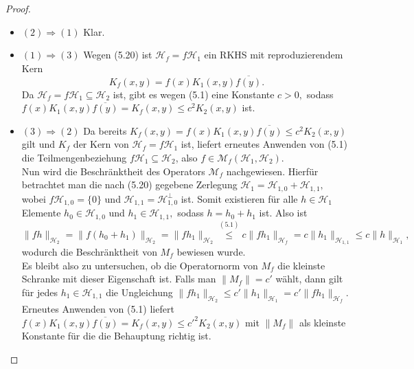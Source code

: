 \documentclass[12pt,titlepage,twoside,cleardoublepage]{article}
\theoremstyle{nummermitklammern}
\numberwithin{equation}{section}
\begin{document}
\begin{proof}
\begin{itemize}
\item $(2)\Rightarrow (1)$ Klar.
\item $(1)\Rightarrow (3)$ Wegen (5.20) ist $\mathcal{H}_f=f\mathcal{H}_1$ ein RKHS mit reproduzierendem Kern
\[
K_f(x,y)=f(x)K_1(x,y)\overline{f(y)}.
\]
 Da $\mathcal{H}_f=f\mathcal{H}_1\subseteq \mathcal{H}_2$ ist, gibt es wegen (5.1) eine Konstante $c>0,$ sodass $f(x)K_1(x,y)\overline{f(y)}=K_f(x,y)\leq c^2K_2(x,y)$ ist.
\item $(3)\Rightarrow (2)$ Da bereits $K_f(x,y)=f(x)K_1(x,y)\overline{f(y)}\leq c^2K_2(x,y)$ gilt und $K_f$ der Kern von $\mathcal{H}_f=f\mathcal{H}_1$ ist, liefert erneutes Anwenden von (5.1) die Teilmengenbeziehung $f\mathcal{H}_1\subseteq\mathcal{H}_2$, also $f\in \mathcal{M}_f(\mathcal{H}_1,\mathcal{H}_2) .$\\
 Nun wird die Beschränktheit des Operators  $\mathcal{M}_f$ nachgewiesen. Hierfür betrachtet man die nach (5.20) gegebene Zerlegung $\mathcal{H}_1=\mathcal{H}_{1,0} + \mathcal{H}_{1,1}, $ wobei $f\mathcal{H}_{1,0}=\{0\}$ und $\mathcal{H}_{1,1}=\mathcal{H}_{1,0}^{\bot}$ ist. Somit existieren für alle $h\in \mathcal{H}_1$ Elemente $h_0\in \mathcal{H}_{1,0}$ und $h_1\in \mathcal{H}_{1,1},$ sodass $h=h_0+h_1$ ist. Also ist 
\[
\|fh\|_{\mathcal{H}_2}=\|f(h_0+h_1)\|_{\mathcal{H}_2}=\|fh_1\|_{\mathcal{H}_2}\overset{(5.1)}{\leq} c \|fh_1\|_{\mathcal{H}_f}=c\|h_1\|_{\mathcal{H}_{1,1}}\leq c\|h\|_{\mathcal{H}_1},
\] wodurch die Beschränktheit von $M_f$ bewiesen wurde. \\
Es bleibt also zu untersuchen, ob die Operatornorm von $M_f$ die kleinste Schranke mit dieser Eigenschaft ist.
Falls man $\|M_f\|=c'$ wählt, dann gilt für jedes $h_1\in \mathcal{H}_{1,1}$ die Ungleichung $\|fh_1\|_{\mathcal{H}_2}\leq c'\|h_1\|_{\mathcal{H}_1}=c'\|fh_1\|_{\mathcal{H}_f}.$ Erneutes Anwenden von (5.1) liefert $f(x)K_1(x,y)\overline{f(y)}=K_f(x,y)\leq c'^2K_2(x,y)$ mit $\|M_f\|$ als kleinste Konstante für die die Behauptung richtig ist.

\end{itemize}
\end{proof}
\end{document}
